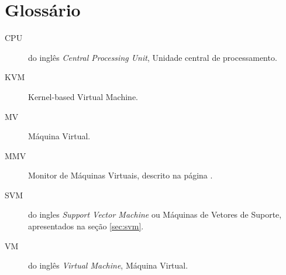 %
%
\chapter{Glossário}

\begin{description}
\item[CPU] do inglês \emph{Central Processing Unit}, Unidade central de processamento.
\item[KVM] Kernel-based Virtual Machine.
\item[MV] Máquina Virtual.
\item[MMV] Monitor de Máquinas Virtuais, descrito na página \pageref{sec:virt}.
\item[SVM] do ingles \emph{Support Vector Machine} ou Máquinas de Vetores
de Suporte, apresentados na seção \ref{sec:svm}.
\item[VM] do inglês \emph{Virtual Machine}, Máquina Virtual.
\end{description}
